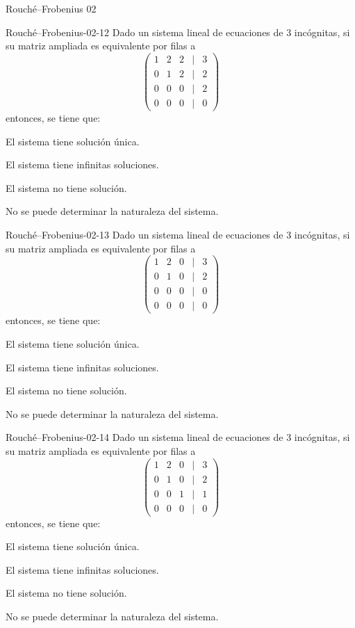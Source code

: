 \documentclass[a4,11pt]{aleph-notas}
\begin{document}
\begin{quiz}{Rouché–Frobenius 02}
\begin{multi}[]%
    {Rouché–Frobenius-02-12}
    Dado un sistema lineal de ecuaciones de 3 incógnitas, si su matriz ampliada es equivalente por filas a 
    \[
    \begin{pmatrix}
    1 & 2 & 2 & | & 3 \\
    0 & 1 & 2 & | & 2 \\
    0 & 0 & 0 & | & 2 \\
    0 & 0 & 0 & | & 0
    \end{pmatrix}
    \]
    entonces, se tiene que:
    \item El sistema tiene solución única.
    \item El sistema tiene infinitas soluciones.
    \item* El sistema no tiene solución.
    \item No se puede determinar la naturaleza del sistema.
\end{multi}


\begin{multi}[]%
    {Rouché–Frobenius-02-13}
    Dado un sistema lineal de ecuaciones de 3 incógnitas, si su matriz ampliada es equivalente por filas a 
    \[
    \begin{pmatrix}
    1 & 2 & 0 & | & 3 \\
    0 & 1 & 0 & | & 2 \\
    0 & 0 & 0 & | & 0 \\
    0 & 0 & 0 & | & 0
    \end{pmatrix}
    \]
    entonces, se tiene que:
    \item El sistema tiene solución única.
    \item* El sistema tiene infinitas soluciones.
    \item El sistema no tiene solución.
    \item No se puede determinar la naturaleza del sistema.
\end{multi}

\begin{multi}[]%
    {Rouché–Frobenius-02-14}
    Dado un sistema lineal de ecuaciones de 3 incógnitas, si su matriz ampliada es equivalente por filas a 
    \[
    \begin{pmatrix}
    1 & 2 & 0 & | & 3 \\
    0 & 1 & 0 & | & 2 \\
    0 & 0 & 1 & | & 1 \\
    0 & 0 & 0 & | & 0
    \end{pmatrix}
    \]
    entonces, se tiene que:
    \item* El sistema tiene solución única.
    \item El sistema tiene infinitas soluciones.
    \item El sistema no tiene solución.
    \item No se puede determinar la naturaleza del sistema.
\end{multi}


\end{quiz}
\end{document}
